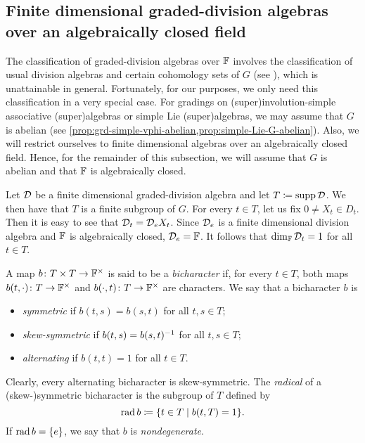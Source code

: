 \subsection{Finite dimensional graded-division algebras over an algebraically closed field}\label{ssec:grd-div-alg}

The classification of graded-division algebras over $\mathbb{F}$ involves the classification of usual division algebras and certain cohomology sets of $G$ (see \cite{Guido}), which is unattainable in general. 
Fortunately, for our purposes, we only need this classification in a very special case. 
For gradings on (super)involution-simple associative (super)algebras or simple Lie (super)algebras, we may assume that $G$ is abelian (see \cref{prop:grd-simple-vphi-abelian,prop:simple-Lie-G-abelian}). 
Also, we will restrict ourselves to finite dimensional algebras over an algebraically closed field. 
Hence, for the remainder of this subsection, we will assume that $G$ is abelian and that $\mathbb{F}$ is algebraically closed.

Let $\mathcal{D}$ be a finite dimensional graded-division algebra and let $T \coloneqq \operatorname{supp} \mathcal{D}$. 
We then have that $T$ is a finite subgroup of $G$.
For every $t\in T$, let us fix $0 \neq X_t\in D_t$. 
Then it is easy to see that $\mathcal{D}_t = \mathcal{D}_e X_t$. 
Since $\mathcal{D}_e$ is a finite dimensional division algebra and $\mathbb{F}$ is algebraically closed, $\mathcal{D}_e = \mathbb{F}$. 
It follows that $\dim_{\mathbb{F}} \mathcal{D}_t = 1$ for all $t\in T$.

\begin{defi}\label{def:bicharacter}
    A map $b\colon T\times T \to \mathbb{F}^\times$ is said to be a \emph{bicharacter} if, for every $t\in T$, both maps $b(t, \cdot)\colon T \to \mathbb{F}^\times$ and $b(\cdot, t)\colon T \to \mathbb{F}^\times$ are characters. 
    We say that a bicharacter $b$ is 
    \begin{itemize}
        \item \emph{symmetric} if $b(t,s) = b(s,t)$ for all $t,s\in T$;
        \item \emph{skew-symmetric} if $b(t,s) = b(s,t)^{-1}$ for all $t,s\in T$;
        \item \emph{alternating} if $b(t,t) = 1$ for all $t\in T$.
    \end{itemize}
    Clearly, every alternating bicharacter is skew-symmetric. 
    The \emph{radical} of a (skew-)symmetric bicharacter is the subgroup of $T$ defined by
    \[
        \operatorname{rad} b \coloneqq \{ t \in T \mid b(t, T) =1 \}.
    \]
    If $\operatorname{rad} b = \{e\}$, we say that $b$ is \emph{nondegenerate}.
\end{defi}

